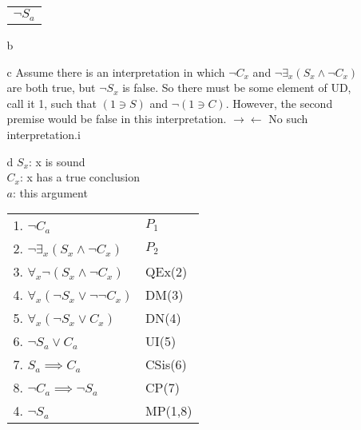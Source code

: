 \documentclass{article}
\begin{document}
\begin{enumerate}
\begin{enumerate}
\begin{tabular}{l}
						$\lnot S_a$\\
					\end{tabular}
				\item[b]
				\item[c]
					Assume there is an interpretation in which $\lnot C_x$ and $\lnot \exists _x (S_x \land \lnot C_x)$ are both true, but $\lnot S_x$ is false. So there must be some element of UD, call it 1, such that $(1 \ni S)$ and $\lnot (1 \ni C)$. However, the second premise would be false in this interpretation. $\rightarrow \leftarrow$ No such interpretation.i
				\item[d]
					$S_x$: x is sound\\
					$C_x$: x has a true conclusion\\
					$a$: this argument\\
					\begin{tabular}{l l}
						1. $\lnot C_a$ & $P_1$\\
						2. $\lnot \exists _x (S_x \land \lnot C_x)$ & $P_2$\\
						3. $\forall _x \lnot (S_x \land \lnot C_x)$ & QEx(2)\\
						4. $\forall _x (\lnot S_x \lor \lnot \lnot C_x)$ & DM(3)\\
						5. $\forall _x (\lnot S_x \lor C_x)$ & DN(4)\\
						6. $\lnot S_a \lor C_a$ & UI(5)\\
						7. $S_a \implies C_a$ & CSis(6)\\
						8. $\lnot C_a \implies \lnot S_a$ & CP(7)\\
						4. $\lnot S_a$ & MP(1,8)\\
					\end{tabular}


\end{enumerate}
\end{enumerate}
\end{document}
